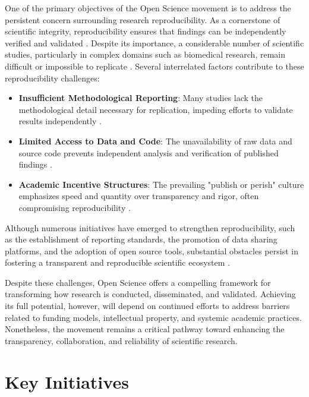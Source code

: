\documentclass[final]{rc-book-2.14}
\begin{document}
One of the primary objectives of the Open Science movement is to address the persistent concern surrounding research reproducibility. As a cornerstone of scientific integrity, reproducibility ensures that findings can be independently verified and validated \cite{Nosek2015}. Despite its importance, a considerable number of scientific studies, particularly in complex domains such as biomedical research, remain difficult or impossible to replicate \cite{Borgman2012}. Several interrelated factors contribute to these reproducibility challenges:

\begin{itemize}
    \item \textbf{Insufficient Methodological Reporting}: Many studies lack the methodological detail necessary for replication, impeding efforts to validate results independently \cite{Leonelli2016}.
    \item \textbf{Limited Access to Data and Code}: The unavailability of raw data and source code prevents independent analysis and verification of published findings \cite{Piwowar2011}.
    \item \textbf{Academic Incentive Structures}: The prevailing "publish or perish" culture emphasizes speed and quantity over transparency and rigor, often compromising reproducibility \cite{Boulton2015}.
\end{itemize}

Although numerous initiatives have emerged to strengthen reproducibility, such as the establishment of reporting standards, the promotion of data sharing platforms, and the adoption of open source tools, substantial obstacles persist in fostering a transparent and reproducible scientific ecosystem \cite{Nosek2015}.

Despite these challenges, Open Science offers a compelling framework for transforming how research is conducted, disseminated, and validated. Achieving its full potential, however, will depend on continued efforts to address barriers related to funding models, intellectual property, and systemic academic practices. Nonetheless, the movement remains a critical pathway toward enhancing the transparency, collaboration, and reliability of scientific research.


\section{Key Initiatives}
\label{chp:review:sec:key_init}
\end{document}
